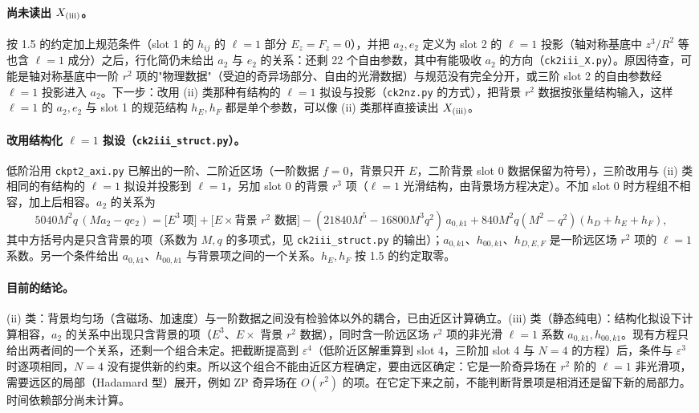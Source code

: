 \documentclass[11pt,a4paper]{ctexart}
\numberwithin{equation}{section}
\begin{document}
\paragraph{尚未读出 $X_{\rm(iii)}$。}按 1.5 的约定加上规范条件（slot 1 的 $h_{ij}$ 的 $\ell=1$ 部分 $E_z=F_z=0$），并把 $a_2,e_2$ 定义为 slot 2 的 $\ell=1$ 投影（轴对称基底中 $z^3/R^2$ 等也含 $\ell=1$ 成分）之后，行化简仍未给出 $a_2$ 与 $e_2$ 的关系：还剩 22 个自由参数，其中有能吸收 $a_2$ 的方向（\texttt{ck2iii\_X.py}）。原因待查，可能是轴对称基底中一阶 $r^2$ 项的"物理数据"（受迫的奇异场部分、自由的光滑数据）与规范没有完全分开，或三阶 slot 2 的自由参数经 $\ell=1$ 投影进入 $a_2$。下一步：改用 (ii) 类那种有结构的 $\ell=1$ 拟设与投影（\texttt{ck2nz.py} 的方式），把背景 $r^2$ 数据按张量结构输入，这样 $\ell=1$ 的 $a_2,e_2$ 与 slot 1 的规范结构 $h_E,h_F$ 都是单个参数，可以像 (ii) 类那样直接读出 $X_{\rm(iii)}$。

\paragraph{改用结构化 $\ell=1$ 拟设（\texttt{ck2iii\_struct.py}）。}低阶沿用 \texttt{ckpt2\_axi.py} 已解出的一阶、二阶近区场（一阶数据 $f=0$，背景只开 $E$，二阶背景 slot 0 数据保留为符号），三阶改用与 (ii) 类相同的有结构的 $\ell=1$ 拟设并投影到 $\ell=1$，另加 slot 0 的背景 $r^3$ 项（$\ell=1$ 光滑结构，由背景场方程决定）。不加 slot 0 时方程组不相容，加上后相容。$a_2$ 的关系为
\begin{equation*}
5040M^2q\,(M a_2-q e_2)=\big[E^3\ \text{项}\big]+\big[E\times\text{背景 }r^2\text{ 数据}\big]-(21840M^5-16800M^3q^2)\,a_{0,k1}+840M^2q(M^2-q^2)(h_D+h_E+h_F),
\end{equation*}
其中方括号内是只含背景的项（系数为 $M,q$ 的多项式，见 \texttt{ck2iii\_struct.py} 的输出）；$a_{0,k1}$、$h_{00,k1}$、$h_{D,E,F}$ 是一阶远区场 $r^2$ 项的 $\ell=1$ 系数。另一个条件给出 $a_{0,k1}$、$h_{00,k1}$ 与背景项之间的一个关系。$h_E,h_F$ 按 1.5 的约定取零。

\paragraph{目前的结论。}(ii) 类：背景均匀场（含磁场、加速度）与一阶数据之间没有检验体以外的耦合，已由近区计算确立。(iii) 类（静态纯电）：结构化拟设下计算相容，$a_2$ 的关系中出现只含背景的项（$E^3$、$E\times$ 背景 $r^2$ 数据），同时含一阶远区场 $r^2$ 项的非光滑 $\ell=1$ 系数 $a_{0,k1},h_{00,k1}$。现有方程只给出两者间的一个关系，还剩一个组合未定。把截断提高到 $\varepsilon^4$（低阶近区解重算到 slot 4，三阶加 slot 4 与 $N=4$ 的方程）后，条件与 $\varepsilon^3$ 时逐项相同，$N=4$ 没有提供新的约束。所以这个组合不能由近区方程确定，要由远区确定：它是一阶奇异场在 $r^2$ 阶的 $\ell=1$ 非光滑项，需要远区的局部（Hadamard 型）展开，例如 ZP 奇异场在 $O(r^2)$ 的项。在它定下来之前，不能判断背景项是相消还是留下新的局部力。时间依赖部分尚未计算。
\end{document}
